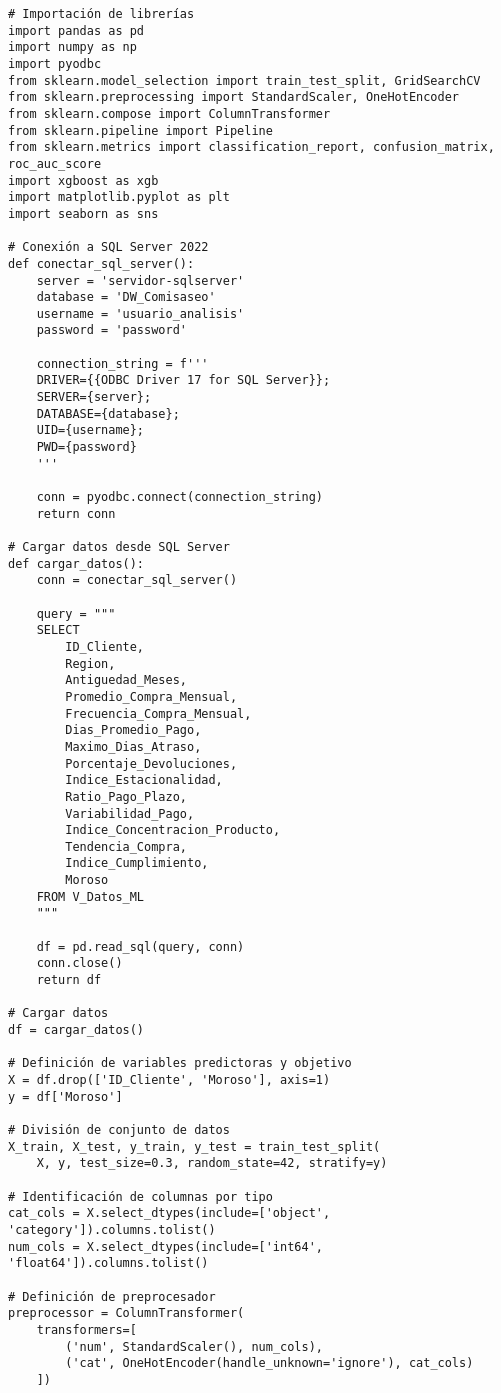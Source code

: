\begin{verbatim}
# Importación de librerías
import pandas as pd
import numpy as np
import pyodbc
from sklearn.model_selection import train_test_split, GridSearchCV
from sklearn.preprocessing import StandardScaler, OneHotEncoder
from sklearn.compose import ColumnTransformer
from sklearn.pipeline import Pipeline
from sklearn.metrics import classification_report, confusion_matrix, roc_auc_score
import xgboost as xgb
import matplotlib.pyplot as plt
import seaborn as sns

# Conexión a SQL Server 2022
def conectar_sql_server():
    server = 'servidor-sqlserver'
    database = 'DW_Comisaseo'
    username = 'usuario_analisis'
    password = 'password'
    
    connection_string = f'''
    DRIVER={{ODBC Driver 17 for SQL Server}};
    SERVER={server};
    DATABASE={database};
    UID={username};
    PWD={password}
    '''
    
    conn = pyodbc.connect(connection_string)
    return conn

# Cargar datos desde SQL Server
def cargar_datos():
    conn = conectar_sql_server()
    
    query = """
    SELECT 
        ID_Cliente,
        Region,
        Antiguedad_Meses,
        Promedio_Compra_Mensual,
        Frecuencia_Compra_Mensual,
        Dias_Promedio_Pago,
        Maximo_Dias_Atraso,
        Porcentaje_Devoluciones,
        Indice_Estacionalidad,
        Ratio_Pago_Plazo,
        Variabilidad_Pago,
        Indice_Concentracion_Producto,
        Tendencia_Compra,
        Indice_Cumplimiento,
        Moroso
    FROM V_Datos_ML
    """
    
    df = pd.read_sql(query, conn)
    conn.close()
    return df

# Cargar datos
df = cargar_datos()

# Definición de variables predictoras y objetivo
X = df.drop(['ID_Cliente', 'Moroso'], axis=1)
y = df['Moroso']

# División de conjunto de datos
X_train, X_test, y_train, y_test = train_test_split(
    X, y, test_size=0.3, random_state=42, stratify=y)

# Identificación de columnas por tipo
cat_cols = X.select_dtypes(include=['object', 'category']).columns.tolist()
num_cols = X.select_dtypes(include=['int64', 'float64']).columns.tolist()

# Definición de preprocesador
preprocessor = ColumnTransformer(
    transformers=[
        ('num', StandardScaler(), num_cols),
        ('cat', OneHotEncoder(handle_unknown='ignore'), cat_cols)
    ])


\end{verbatim}
